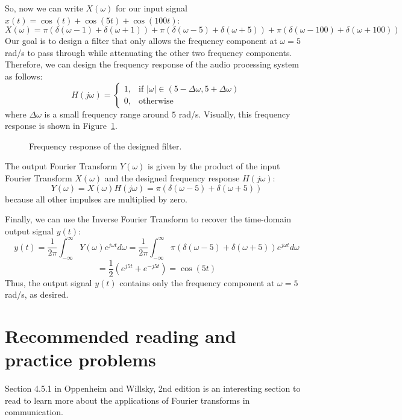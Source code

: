 So, now we can write $X(\omega)$ for our input signal \( x(t) = \cos(t) + \cos(5t) + \cos(100t) \):
\[
X(\omega) = \pi \left( \delta(\omega - 1) + \delta(\omega + 1) \right) + \pi \left( \delta(\omega - 5) + \delta(\omega + 5) \right) + \pi \left( \delta(\omega - 100) + \delta(\omega + 100) \right)
\]
Our goal is to design a filter that only allows the frequency component at \( \omega = 5 \) rad/s to pass through while attenuating the other two frequency components. Therefore, we can design the frequency response of the audio processing system as follows:
\[
H(j\omega) = \begin{cases}
    1, & \text{if } |\omega| \in (5 - \Delta \omega, 5 + \Delta \omega) \\
    0, & \text{otherwise}
\end{cases}
\]
where \( \Delta \omega \) is a small frequency range around \( 5 \) rad/s. Visually, this frequency response is shown in Figure~\ref{fig:frequency_response_example}.
\begin{figure}[h]
    \centering

    \caption{Frequency response of the designed filter.}
    \label{fig:frequency_response_example}
\end{figure}
The output Fourier Transform \( Y(\omega) \) is given by the product of the input Fourier Transform \( X(\omega) \) and the designed frequency response \( H(j\omega) \):
\[
Y(\omega) = X(\omega) H(j\omega)
= \pi \left( \delta(\omega - 5) + \delta(\omega + 5) \right)
\]
because all other impulses are multiplied by zero.

Finally, we can use the Inverse Fourier Transform to recover the time-domain output signal \( y(t) \):
\[
y(t) = \frac{1}{2\pi} \int_{-\infty}^{\infty} Y(\omega) e^{j \omega t} d\omega
= \frac{1}{2\pi} \int_{-\infty}^{\infty} \pi \left( \delta(\omega - 5) + \delta(\omega + 5) \right) e^{j \omega t} d\omega
\]
\[
= \frac{1}{2} \left( e^{j 5 t} + e^{-j 5 t} \right) = \cos(5t)
\]
Thus, the output signal \( y(t) \) contains only the frequency component at \( \omega = 5 \) rad/s, as desired.

\section{Recommended reading and practice problems}
Section 4.5.1 in Oppenheim and Willsky, 2nd edition is an interesting section to read to learn more about the applications of Fourier transforms in communication.
